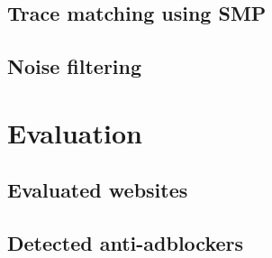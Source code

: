 \documentclass[en]{pracamgr}
\begin{document}
\section{Trace matching using SMP}
\section{Noise filtering}

\chapter{Evaluation}
\section{Evaluated websites}
\section{Detected anti-adblockers}


{}

\end{document}
